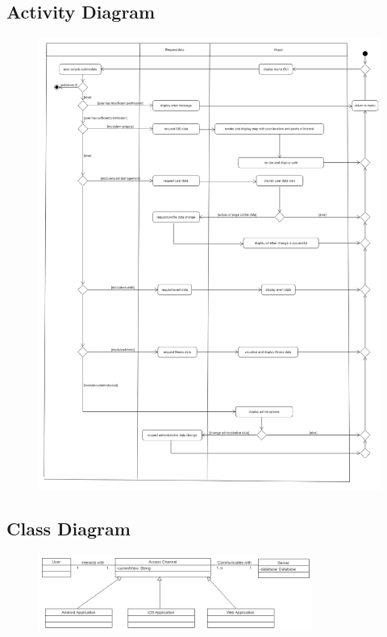 \subsection{Activity Diagram}
\begin{figure}[H]
	\includegraphics[width=\textwidth]{Access_Modules/AcessActivity.png}
\end{figure}

\subsection{Class Diagram}
\begin{figure}[H]
	\includegraphics[width=0.8\textwidth]{Access_Modules/AccessClassDiagramV2.png}
\end{figure}
